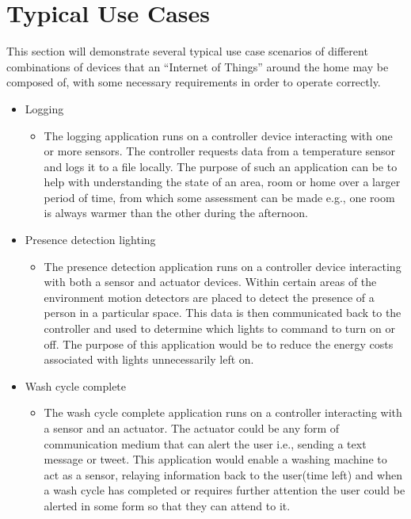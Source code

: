 \section{Typical Use Cases} %
\label{sec:typical_use_cases}
This section will demonstrate several typical use case scenarios of different combinations of devices that an ``Internet of Things'' around the home may be composed of, with some necessary requirements in order to operate correctly.

\begin{itemize}
	\item Logging %
	\begin{itemize}
		\item The logging application runs on a controller device interacting with one or more sensors. The controller requests data from a temperature sensor and logs it to a file locally. The purpose of such an application can be to help with understanding the state of an area, room or home over a larger period of time, from which some assessment can be made e.g., one room is always warmer than the other during the afternoon. 
	\end{itemize}
	\item Presence detection lighting %
	\begin{itemize}
		\item The presence detection application runs on a controller device interacting with both a sensor and actuator devices. Within certain areas of the environment motion detectors are placed to detect the presence of a person in a particular space. This data is then communicated back to the controller and used to determine which lights to command to turn on or off. The purpose of this application would be to reduce the energy costs associated with lights unnecessarily left on.
	\end{itemize}
	\item Wash cycle complete
	\begin{itemize}
		\item The wash cycle complete application runs on a controller interacting with a sensor and an actuator. The actuator could be any form of communication medium that can alert the user i.e., sending a text message or tweet. This application would enable a washing machine to act as a sensor, relaying information back to the user(time left) and when a wash cycle has completed or requires further attention the user could be alerted in some form so that they can attend to it.

\end{itemize}
\end{itemize}
